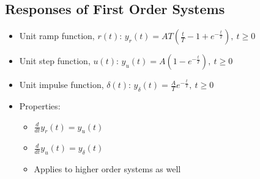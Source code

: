 \documentclass[a4paper]{article}
\begin{document}
\subsection{Responses of First Order Systems}
\begin{itemize}
    \item Unit ramp function, $r(t)$: $y_r(t) = AT\left(\frac{t}{T}-1+e^{-\frac{t}{T}}\right),\ t\geq 0$
    \item Unit step function, $u(t)$: $y_u(t) = A(1-e^{-\frac{t}{T}}),\ t\geq 0$
    \item Unit impulse function, $\delta(t)$: $y_\delta(t) =\displaystyle\frac{A}{T}e^{-\frac{t}{T}},\ t\geq 0$
    \item Properties:
    \begin{itemize}[label=$\circ$]
        \item $\displaystyle\frac{d}{dt}y_r(t) = y_u(t)$
        \item $\displaystyle\frac{d}{dt}y_u(t) = y_\delta(t)$
        \item Applies to higher order systems as well
    \end{itemize}
\end{itemize}
\end{document}
